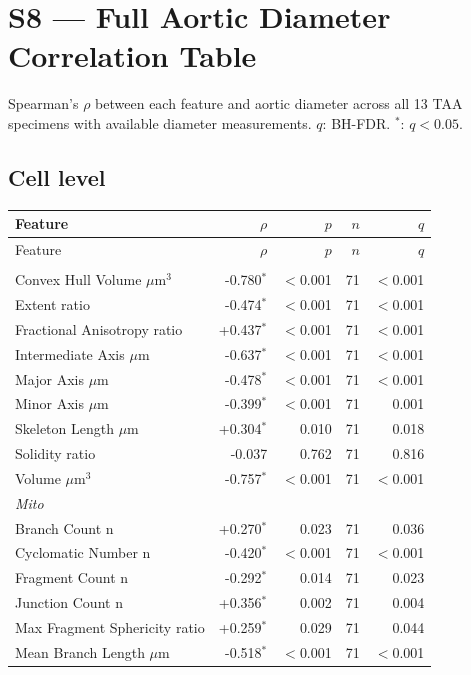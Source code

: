 \documentclass[11pt,a4paper]{article}
\begin{document}
\section*{S8 — Full Aortic Diameter Correlation Table}
Spearman's $\rho$ between each feature and aortic diameter across all 13 TAA
specimens with available diameter measurements. $q$: BH-FDR. $^{*}$: $q<0.05$.
\vspace{1em}
\subsection*{Cell level}
\begin{longtable}{lrrrr}
\toprule
Feature & $\rho$ & $p$ & $n$ & $q$ \\
\midrule\endfirsthead
\toprule Feature & $\rho$ & $p$ & $n$ & $q$ \\\midrule\endhead
\bottomrule\endfoot
\multicolumn{5}{l}{\textit{Actin}} \\
  Convex Hull Volume $\mu$m$^{3}$ & -0.780$^{*}$ & $<$0.001 & 71 & $<$0.001 \\
  Extent ratio & -0.474$^{*}$ & $<$0.001 & 71 & $<$0.001 \\
  Fractional Anisotropy ratio & +0.437$^{*}$ & $<$0.001 & 71 & $<$0.001 \\
  Intermediate Axis $\mu$m & -0.637$^{*}$ & $<$0.001 & 71 & $<$0.001 \\
  Major Axis $\mu$m & -0.478$^{*}$ & $<$0.001 & 71 & $<$0.001 \\
  Minor Axis $\mu$m & -0.399$^{*}$ & $<$0.001 & 71 & 0.001 \\
  Skeleton Length $\mu$m & +0.304$^{*}$ & 0.010 & 71 & 0.018 \\
  Solidity ratio & -0.037 & 0.762 & 71 & 0.816 \\
  Volume $\mu$m$^{3}$ & -0.757$^{*}$ & $<$0.001 & 71 & $<$0.001 \\
\midrule
\multicolumn{5}{l}{\textit{Mito}} \\
  Branch Count n & +0.270$^{*}$ & 0.023 & 71 & 0.036 \\
  Cyclomatic Number n & -0.420$^{*}$ & $<$0.001 & 71 & $<$0.001 \\
  Fragment Count n & -0.292$^{*}$ & 0.014 & 71 & 0.023 \\
  Junction Count n & +0.356$^{*}$ & 0.002 & 71 & 0.004 \\
  Max Fragment Sphericity ratio & +0.259$^{*}$ & 0.029 & 71 & 0.044 \\
  Mean Branch Length $\mu$m & -0.518$^{*}$ & $<$0.001 & 71 & $<$0.001 \\

\end{longtable}
\end{document}
